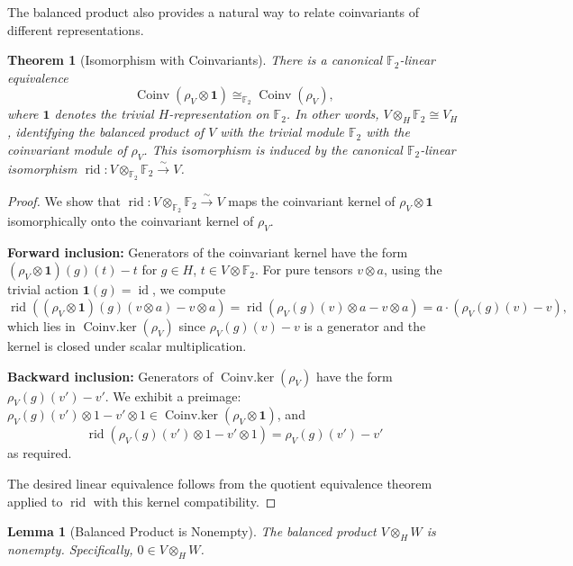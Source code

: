 \documentclass[11pt]{article}
\theoremstyle{plain}
\newtheorem*{theorem}{Theorem}
\newtheorem*{lemma}{Lemma}
\theoremstyle{definition}
\theoremstyle{remark}
\begin{document}
The balanced product also provides a natural way to relate coinvariants of different representations.

\begin{theorem}[Isomorphism with Coinvariants]
There is a canonical $\mathbb{F}_2$-linear equivalence
\[
\operatorname{Coinv}(\rho_V \otimes \mathbf{1}) \cong_{\mathbb{F}_2} \operatorname{Coinv}(\rho_V),
\]
where $\mathbf{1}$ denotes the trivial $H$-representation on $\mathbb{F}_2$. In other words, $V \otimes_H \mathbb{F}_2 \cong V_H$, identifying the balanced product of $V$ with the trivial module $\mathbb{F}_2$ with the coinvariant module of $\rho_V$. This isomorphism is induced by the canonical $\mathbb{F}_2$-linear isomorphism $\operatorname{rid} : V \otimes_{\mathbb{F}_2} \mathbb{F}_2 \xrightarrow{\sim} V$.
\end{theorem}

\begin{proof}
We show that $\operatorname{rid} : V \otimes_{\mathbb{F}_2} \mathbb{F}_2 \xrightarrow{\sim} V$ maps the coinvariant kernel of $\rho_V \otimes \mathbf{1}$ isomorphically onto the coinvariant kernel of $\rho_V$.

\textbf{Forward inclusion:} Generators of the coinvariant kernel have the form $(\rho_V \otimes \mathbf{1})(g)(t) - t$ for $g \in H$, $t \in V \otimes \mathbb{F}_2$. For pure tensors $v \otimes a$, using the trivial action $\mathbf{1}(g) = \operatorname{id}$, we compute 
\[
\operatorname{rid}((\rho_V \otimes \mathbf{1})(g)(v \otimes a) - v \otimes a) = \operatorname{rid}(\rho_V(g)(v) \otimes a - v \otimes a) = a \cdot (\rho_V(g)(v) - v),
\]
which lies in $\operatorname{Coinv.ker}(\rho_V)$ since $\rho_V(g)(v) - v$ is a generator and the kernel is closed under scalar multiplication.

\textbf{Backward inclusion:} Generators of $\operatorname{Coinv.ker}(\rho_V)$ have the form $\rho_V(g)(v') - v'$. We exhibit a preimage: $\rho_V(g)(v') \otimes 1 - v' \otimes 1 \in \operatorname{Coinv.ker}(\rho_V \otimes \mathbf{1})$, and 
\[
\operatorname{rid}(\rho_V(g)(v') \otimes 1 - v' \otimes 1) = \rho_V(g)(v') - v'
\]
as required.

The desired linear equivalence follows from the quotient equivalence theorem applied to $\operatorname{rid}$ with this kernel compatibility.
\end{proof}

\begin{lemma}[Balanced Product is Nonempty]
The balanced product $V \otimes_H W$ is nonempty. Specifically, $0 \in V \otimes_H W$.
\end{lemma}
\end{document}
